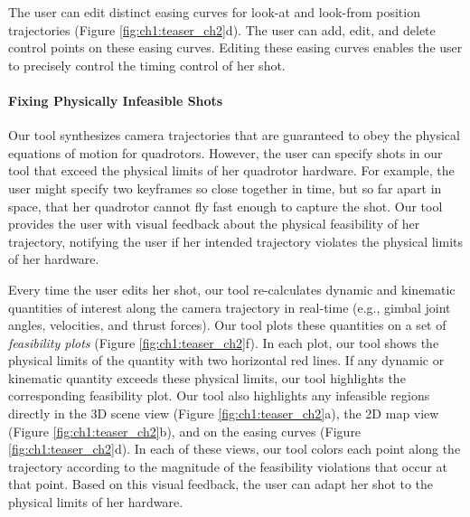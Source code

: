 The user can edit distinct easing curves for look-at and look-from position trajectories (Figure \ref{fig:ch1:teaser_ch2}d).
The user can add, edit, and delete control points on these easing curves.
Editing these easing curves enables the user to precisely control the timing control of her shot.


\paragraph{Fixing Physically Infeasible Shots}

Our tool synthesizes camera trajectories that are guaranteed to obey the physical equations of motion for quadrotors. However, the user can specify shots in our tool that exceed the physical limits of her quadrotor hardware.
For example, the user might specify two keyframes so close together in time, but so far apart in space, that her quadrotor cannot fly fast enough to capture the shot.
Our tool provides the user with visual feedback about the physical feasibility of her trajectory, notifying the user if her intended trajectory violates the physical limits of her  hardware.

Every time the user edits her shot, our tool re-calculates dynamic and kinematic quantities of interest along the camera trajectory in real-time (e.g., gimbal joint angles, velocities, and thrust forces).
Our tool plots these quantities on a set of \emph{feasibility plots} (Figure \ref{fig:ch1:teaser_ch2}f).
In each plot, our tool shows the physical limits of the quantity with two horizontal red lines.
If any dynamic or kinematic quantity exceeds these physical limits, our tool highlights the corresponding feasibility plot.
Our tool also highlights any infeasible regions directly in the 3D scene view (Figure \ref{fig:ch1:teaser_ch2}a), the 2D map view (Figure \ref{fig:ch1:teaser_ch2}b), and on the easing curves (Figure \ref{fig:ch1:teaser_ch2}d).
In each of these views, our tool colors each point along the trajectory according to the magnitude of the feasibility violations that occur at that point.
Based on this visual feedback, the user can adapt her shot to the physical limits of her hardware.

